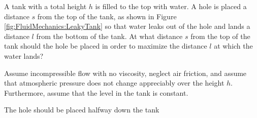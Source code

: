 \begin{solution}
\end{solution}

\question A tank with a total height $h$ is filled to the top with water. A hole is placed a distance $s$ from the top of the tank, as shown in Figure \ref{fig:FluidMechanics:LeakyTank} so that water leaks out of the hole and lands a distance $l$ from the bottom of the tank. At what distance $s$ from the top of the tank should the hole be placed in order to maximize the distance $l$ at which the water lands?

Assume incompressible flow with no viscosity, neglect air friction, and assume that atmospheric pressure does not change appreciably over the height $h$. Furthermore, assume that the level in the tank is constant.


\begin{finalanswer}
	The hole should be placed halfway down the tank
\end{finalanswer}

